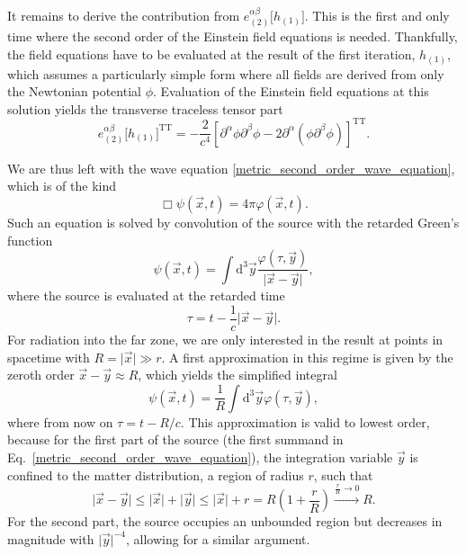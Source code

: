 It remains to derive the contribution from $e^{\alpha\beta}_{(2)}\lbrack h_{(1)}\rbrack$. This is the first and only time where the second order of the Einstein field equations is needed. Thankfully, the field equations have to be evaluated at the result of the first iteration, $h_{(1)}$, which assumes a particularly simple form where all fields are derived from only the Newtonian potential $\phi$. Evaluation of the Einstein field equations at this solution yields the transverse traceless tensor part
\begin{equation}
  e^{\alpha\beta}_{(2)}\lbrack h_{(1)}\rbrack^\text{TT} = -\frac{2}{c^4}\left\lbrack\partial^\alpha\phi\partial^\beta\phi - 2\partial^\alpha(\phi\partial^\beta\phi) \right\rbrack^\text{TT}.
\end{equation}

We are thus left with the wave equation \eqref{metric_second_order_wave_equation}, which is of the kind
\begin{equation}
  \Box\psi(\vec x,t) = 4\pi\varphi(\vec x,t).
\end{equation}
Such an equation is solved by convolution of the source with the retarded Green's function \cite{}
\begin{equation}
  \psi(\vec x,t) = \int\mathrm d^3\vec y\frac{\varphi(\tau,\vec y)}{\lvert\vec x-\vec y\rvert},
\end{equation}
where the source is evaluated at the retarded time
\begin{equation}
  \tau = t - \frac{1}{c}\lvert\vec x-\vec y\rvert.
\end{equation}
For radiation into the far zone, we are only interested in the result at points in spacetime with $R=\lvert\vec x\rvert\gg r$. A first approximation in this regime is given by the zeroth order $\vec x - \vec y \approx R$, which yields the simplified integral
\begin{equation}
  \psi(\vec x,t) = \frac{1}{R}\int\mathrm d^3\vec y\varphi(\tau,\vec y),
\end{equation}
where from now on $\tau = t-R/c$. This approximation is valid to lowest order, because for the first part of the source (the first summand in Eq.~\eqref{metric_second_order_wave_equation}), the integration variable $\vec y$ is confined to the matter distribution, a region of radius $r$, such that
\begin{equation}
  \lvert\vec x-\vec y\rvert \leq \lvert\vec x\rvert + \lvert\vec y\rvert \leq \lvert\vec x\rvert + r = R(1 + \frac{r}{R}) \xrightarrow{\frac{r}{R}\to 0} R.
\end{equation}
For the second part, the source occupies an unbounded region but decreases in magnitude with $\lvert\vec y\rvert^{-4}$, allowing for a similar argument.

